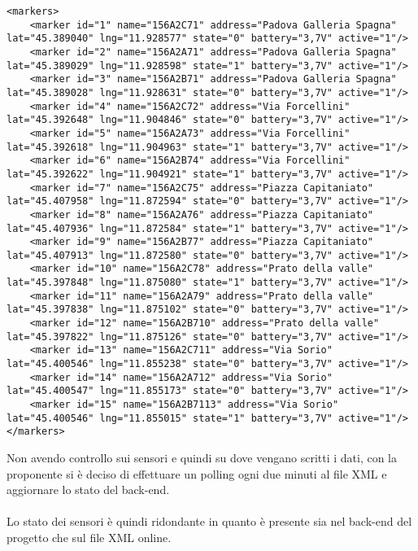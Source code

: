 \begin{lstlisting}[style=XML]
<markers>
    <marker id="1" name="156A2C71" address="Padova Galleria Spagna" lat="45.389040" lng="11.928577" state="0" battery="3,7V" active="1"/>
    <marker id="2" name="156A2A71" address="Padova Galleria Spagna" lat="45.389029" lng="11.928598" state="1" battery="3,7V" active="1"/>
    <marker id="3" name="156A2B71" address="Padova Galleria Spagna" lat="45.389028" lng="11.928631" state="0" battery="3,7V" active="1"/>
    <marker id="4" name="156A2C72" address="Via Forcellini" lat="45.392648" lng="11.904846" state="0" battery="3,7V" active="1"/>
    <marker id="5" name="156A2A73" address="Via Forcellini" lat="45.392618" lng="11.904963" state="1" battery="3,7V" active="1"/>
    <marker id="6" name="156A2B74" address="Via Forcellini" lat="45.392622" lng="11.904921" state="1" battery="3,7V" active="1"/>
    <marker id="7" name="156A2C75" address="Piazza Capitaniato" lat="45.407958" lng="11.872594" state="0" battery="3,7V" active="1"/>
    <marker id="8" name="156A2A76" address="Piazza Capitaniato" lat="45.407936" lng="11.872584" state="1" battery="3,7V" active="1"/>
    <marker id="9" name="156A2B77" address="Piazza Capitaniato" lat="45.407913" lng="11.872580" state="0" battery="3,7V" active="1"/>
    <marker id="10" name="156A2C78" address="Prato della valle" lat="45.397848" lng="11.875080" state="1" battery="3,7V" active="1"/>
    <marker id="11" name="156A2A79" address="Prato della valle" lat="45.397838" lng="11.875102" state="0" battery="3,7V" active="1"/>
    <marker id="12" name="156A2B710" address="Prato della valle" lat="45.397822" lng="11.875126" state="0" battery="3,7V" active="1"/>
    <marker id="13" name="156A2C711" address="Via Sorio" lat="45.400546" lng="11.855238" state="0" battery="3,7V" active="1"/>
    <marker id="14" name="156A2A712" address="Via Sorio" lat="45.400547" lng="11.855173" state="0" battery="3,7V" active="1"/>
    <marker id="15" name="156A2B7113" address="Via Sorio" lat="45.400546" lng="11.855015" state="1" battery="3,7V" active="1"/>
</markers>
\end{lstlisting}
\leavevmode\newline
Non avendo controllo sui sensori e quindi su dove vengano scritti i dati, con la proponente si è deciso
di effettuare un polling ogni due minuti al file \gls{XML} e aggiornare lo stato del \gls{back-end}.
\\\\
Lo stato dei sensori è quindi ridondante in quanto è presente sia nel \gls{back-end} del progetto che sul file \gls{XML} online. 
